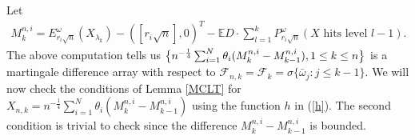 \documentclass[11pt]{amsart}
\begin{document}
Let 
\begin{eqnarray}
\label{mart}
M_k^{n,i}=E_{r_i \sqrt{n}}^{\omega}(X_{\lambda_k}) -([r_i\sqrt{n}],0)^T - \mathbb{E}D \cdot
\sum_{l=1}^k P_{r_i \sqrt{n}}^{\omega}(X \mbox{ hits level } l-1 ) . 
\end{eqnarray}
The above computation tells us $\big{\{}n^{-\frac{1}{4}}\sum_{i=1}^N \theta_i (M_k^{n,i} - M_{k-1}^{n,i}), 1 \leq k \leq n \big{\}} $  is a martingale difference array with respect to $\mathcal{F}_{n,k} = \mathcal{F}_k = \sigma\lbrace\bar  {\omega}_j : j \le k-1\rbrace$. We will now check the conditions of Lemma \ref{MCLT} for $X_{n,k}=n^{-\frac{1}{4}}\sum_{i=1}^N \theta_i (M_k^{n,i} - M_{k-1}^{n,i})$ using the function $h$ in (\ref{h}). The second condition is trivial to check since the difference $M_k^{n,i}-M_{k-1}^{n,i}$ is bounded.
\end{document}
